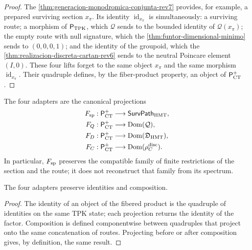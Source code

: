 \begin{proof}
The \cref{thm:generacion-monodromica-conjunta-rev7} provides, for example,
a prepared surviving section \(x_\pi\). Its identity
\(\operatorname{id}_{x_\pi}\) is simultaneously: a surviving route;
a morphism of \(\mathsf P_{\rm TPK}\), which \(\mathcal Q\) sends to the
bounded identity of \(\mathcal Q(x_\pi)\); the empty route with null signature,
which the \cref{thm:funtor-dimensional-minimo} sends to
\((0,0,0,1)\); and the identity of the groupoid, which the
\cref{thm:realizacion-discreta-cartan-rev6} sends to the neutral Poincare element
\((I,0)\). These four lifts forget to the same object
\(x_\pi\) and the same morphism \(\operatorname{id}_{x_\pi}\). Their quadruple
defines, by the fiber-product property, an object of
\(\mathsf P_{\rm CT}^{+}\).
\end{proof}

\begin{definition}
\label{def:int68-pct-positive}
The four adapters are the canonical projections
\[
 \begin{aligned}
 F_{\rm sp}:\mathsf P_{\rm CT}^{+}&\longrightarrow
     \mathsf{SurvPath}_{\rm HMT},\\
 F_Q:\mathsf P_{\rm CT}^{+}&\longrightarrow\operatorname{Dom}(\mathcal Q),\\
 F_D:\mathsf P_{\rm CT}^{+}&\longrightarrow
     \operatorname{Dom}(\mathfrak D_{\rm HMT}),\\
 F_C:\mathsf P_{\rm CT}^{+}&\longrightarrow
     \operatorname{Dom}(\rho_C^{\rm disc}).
 \end{aligned}
\]
In particular, \(F_{\rm sp}\) preserves the compatible family of
finite restrictions of the section and the route; it does not reconstruct that family
from its spectrum.
\end{definition}

\begin{lemma}
\label{lem:int68-adaptadores}
The four adapters preserve identities and composition.
\end{lemma}

\begin{proof}
The identity of an object of the fibered product is the quadruple of identities
on the same TPK state; each projection returns the identity of the factor.
Composition is defined componentwise between quadruples that
project onto the same concatenation of routes. Projecting before or after
composition gives, by definition, the same result.
\end{proof}

